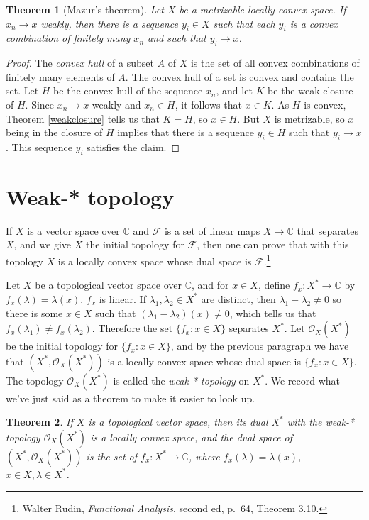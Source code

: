 \documentclass{article}
\newtheorem{theorem}{Theorem}
\begin{document}
\begin{theorem}[Mazur's theorem]
Let $X$ be a metrizable locally convex space. If $x_n \to x$ weakly, then there is a sequence $y_i \in X$ such that
each $y_i$ is a convex combination of finitely many $x_n$ and such that $y_i \to x$. 
\end{theorem}
\begin{proof}
The {\em convex hull} of a subset $A$ of $X$ is the set of all convex combinations of finitely many elements of
$A$. The  convex hull of a set is convex and contains the set. Let $H$ be the convex hull
of the sequence $x_n$, and let $K$ be the weak closure of $H$.  
Since $x_n \to x$ weakly and $x_n \in H$,
it follows that $x \in K$. As $H$ is convex, Theorem \ref{weakclosure} tells us that $K= \overline{H}$, so
$x \in \overline{H}$. But $X$ is metrizable, so $x$ being in the closure of $H$ implies that there is a sequence $y_i \in H$ such that
$y_i \to x$.
This sequence
$y_i$ satisfies the claim.
\end{proof}



\section{Weak-* topology}
If $X$ is a vector space over $\mathbb{C}$ and $\mathcal{F}$ is a set of linear maps $X \to \mathbb{C}$
that separates $X$, and we give $X$ the initial topology for $\mathcal{F}$,
then one can prove that with this topology $X$ is a locally convex
space whose dual space is $\mathcal{F}$.\footnote{Walter Rudin, {\em Functional Analysis}, second ed, p.~64, Theorem 3.10.} 

Let $X$ be a topological vector space over $\mathbb{C}$, and for $x \in X$, define $f_x:X^* \to \mathbb{C}$
by $f_x(\lambda) = \lambda(x)$. $f_x$ is linear. If $\lambda_1,\lambda_2 \in X^*$ are distinct, then $\lambda_1-\lambda_2 \neq 0$ so
there is some $x \in X$ such that $(\lambda_1-\lambda_2)(x) \neq 0$, which tells us that $f_x(\lambda_1) \neq f_x(\lambda_2)$. Therefore
the set $\{f_x : x\in X\}$ separates $X^*$. Let $\mathcal{O}_X(X^*)$ be the initial topology for $\{f_x: x\in X\}$, and by the previous paragraph
we have that $(X^*,\mathcal{O}_X(X^*))$ is a locally convex space whose dual space is
$\{f_x:x \in X\}$. The topology $\mathcal{O}_X(X^*)$ is called the {\em weak-* topology}
on $X^*$.  We record what we've just said as a theorem to make it easier to look up.

\begin{theorem}
If $X$ is a topological vector space,  then its dual
$X^*$ with the weak-* topology $\mathcal{O}_X(X^*)$ is a locally convex space,
and the dual space of $(X^*,\mathcal{O}_X(X^*))$ is the set of $f_x:X^* \to \mathbb{C}$, where $f_x(\lambda)=\lambda(x)$, $x \in X, \lambda \in X^*$.
\label{weakstar}
\end{theorem}
\end{document}
